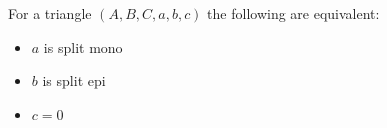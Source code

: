     \begin{lemma}
        For a triangle $(A,B,C,a,b,c)$ the following are equivalent:

        \begin{center}
            \begin{minipage}[c]{0.3\textwidth}
            \end{minipage}
            \begin{minipage}[c]{0.3\textwidth}
                \begin{itemize}
                    \item $a$ is split mono
                    \item $b$ is split epi
                    \item $c = 0$
                \end{itemize}
            \end{minipage}
        \end{center}
    \end{lemma}

